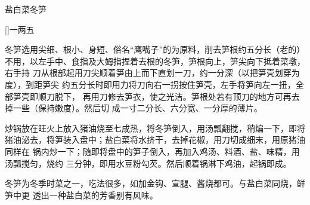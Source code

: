 \begin{recipe}{盐白菜冬笋}

\ingredients

[\footnotemark]{一两五}

\preparation

\step 冬笋选用尖细、根小、身短、俗名“鹰嘴子”的为原料，削去笋根约五分长（老的）
不用，以左手中、食指及大姆指捏着去根的冬笋，笋根向上，笋尖向下抵着菜墩，右手持
刀从根部起用刀尖顺着笋由上而下直划一刀，约一分深（以把笋壳划穿为度），到距笋尖
约五分长时即用力将刀向右一拐按住笋壳，左手将笋向左一扭，全部笋壳即顺刀脱下，
再用刀修去笋衣，使之光洁。笋根处若有顶刀的地方可再去掉一些（保持嫩度）。然后切
成一寸二分长、六分宽、一分厚的薄片。

\step 炒锅放在旺火上放入猪油烧至七成热，将冬笋倒入，用汤瓢翻搅，稍煸一下，即将
猪油泌去，将笋装入盘中；盐白菜将水挤干，去掉花椒，用刀切成细末，用原猪油同样在
锅内炒一下；随即将盘中的笋子倒入，再加入鸡汤、料酒、盐、味精，用汤瓢搅匀，烧约
三分钟，即用水豆粉勾芡。然后顺着锅淋下鸡油，起锅即成。

\features

冬笋为冬季时菜之一，吃法很多，如加金钩、宣腿、酱烧都可。与盐白菜同烧，鲜笋中更
透出一种盐白菜的芳香别有风味。


\end{recipe}

